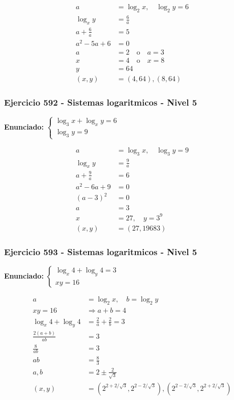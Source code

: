 \documentclass[12pt,a4paper]{article}
\begin{document}
\[
\begin{aligned}
a&=\log_2x,
\quad \log_2y=6\\
\log_xy&=\frac6a\\
a+\frac6a&=5\\
a^2-5a+6&=0\\
a&=2\quad \text{o}\quad a=3\\
x&=4\quad \text{o}\quad x=8\\
y&=64\\
(x,y)&=\boxed{(4,64),(8,64)}
\end{aligned}
\]


\subsubsection*{Ejercicio 592 - Sistemas logaritmicos - Nivel 5}
\textbf{Enunciado:} \(\begin{cases}\log_3x+\log_xy=6\\ \log_3y=9\end{cases}\)

\[
\begin{aligned}
a&=\log_3x,
\quad \log_3y=9\\
\log_xy&=\frac9a\\
a+\frac9a&=6\\
a^2-6a+9&=0\\
(a-3)^2&=0\\
a&=3\\
x&=27,
\quad y=3^9\\
(x,y)&=\boxed{(27,19683)}
\end{aligned}
\]


\subsubsection*{Ejercicio 593 - Sistemas logaritmicos - Nivel 5}
\textbf{Enunciado:} \(\begin{cases}\log_x4+\log_y4=3\\ xy=16\end{cases}\)

\[
\begin{aligned}
a&=\log_2x,
\quad b=\log_2y\\
xy=16&\Rightarrow a+b=4\\
\log_x4+\log_y4&=\frac2a+\frac2b=3\\
\frac{2(a+b)}{ab}&=3\\
\frac8{ab}&=3\\
ab&=\frac83\\
a,b&=2\pm\frac{2}{\sqrt3}\\
(x,y)&=\boxed{\left(2^{2+2/\sqrt3},2^{2-2/\sqrt3}\right),\left(2^{2-2/\sqrt3},2^{2+2/\sqrt3}\right)}
\end{aligned}
\]
\end{document}
